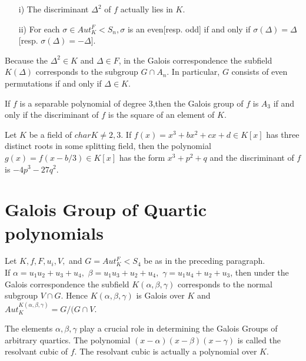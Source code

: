 \begin{theorem}
\begin{enumerate}
\item[i)] The discriminant \({\Delta}^2\) of \(f\) actually lies in \(K\).
  \item[ii)] For each \(\sigma \in Aut_K^F < S_n, \sigma\) is an even[resp. odd] if and only if \(\sigma(\Delta) = \Delta\)[resp. \(\sigma(\Delta) = - \Delta\)].
  \end{enumerate}
\end{theorem}
Because the \({\Delta}^2 \in K\) and \(\Delta \in F\), in the Galois correspondence the subfield \(K(\Delta)\) corresponds to the subgroup \(G \cap A_n\). In particular, \(G\) consists of even permutations if and only if \(\Delta \in K\).
\begin{corollary}
  If \(f\) is a separable polynomial of degree \(3\),then the Galois group of \(f\) is \(A_3\) if and only if the discriminant of \(f\) is the square of an element of \(K\).
\end{corollary}

\begin{theorem}
  Let \(K\) be a field of \(char K \neq 2,3 \). If \(f(x)=x^3+bx^2+cx+d \in K[x]\) has three distinct roots in some splitting field, then the polynomial \(g(x)=f(x-b/3) \in K[x]\) has the form \(x^3+p^2+q\) and the discriminant of \(f\) is \(-4p^3-27q^2\).
\end{theorem}

\section{Galois Group of Quartic polynomials}
Let \(K, f, F, u_i, V,\) and \(G=Aut_K^F<S_4\) be as in the preceding paragraph.\\
If \(\alpha=u_1u_2+u_3+u_4,\) \(\beta=u_1u_3+u_2+u_4,\) \(\gamma=u_1u_4+u_2+u_3\), then under the Galois correspondence the subfield \(K(\alpha, \beta, \gamma)\) corresponds to the normal subgroup \(V \cap G\). Hence \(K(\alpha, \beta, \gamma)\) is Galois over \(K\) and \(Aut_K^{K(\alpha, \beta, \gamma)} = G/(G \cap V\).

\begin{definition}
  The elements \(\alpha, \beta, \gamma\) play a crucial role in determining the Galois Groups of arbitrary quartics. The polynomial \( (x- \alpha)(x- \beta)(x- \gamma) \) is called the resolvant cubic of \(f\). The resolvant cubic is actually a polynomial over \(K\).\\
\end{definition}


